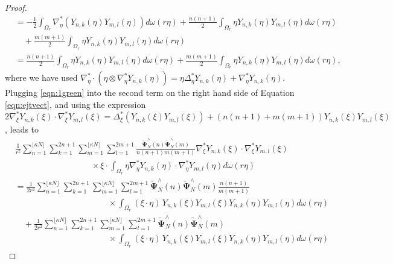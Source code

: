 \documentclass[a4paper, 10pt]{article}
\numberwithin{equation}{section}
\theoremstyle{definition}
\begin{document}
\begin{proof}
\begin{align}
&=-\frac{1}{2}\int_{\Omega_r}\nabla_{\eta }^*\left(Y_{n,k}\left(\eta \right)Y_{m,l}\left(\eta \right)\right)d\omega(r\eta)\nonumber
+\frac{n(n+1)}{2}\int_{\Omega_r}\eta  Y_{n,k}\left(\eta \right)Y_{m,l}\left(\eta \right)d\omega(r\eta)\nonumber
\\&\quad+\frac{m(m+1)}{2}\int_{\Omega_r}\eta  Y_{n,k}\left(\eta \right)Y_{m,l}\left(\eta \right)d\omega(r\eta)\nonumber
\\&=\frac{n(n+1)}{2}\int_{\Omega_r}\eta  Y_{n,k}\left(\eta \right)Y_{m,l}\left(\eta \right)d\omega(r\eta)\nonumber
+\frac{m(m+1)}{2}\int_{\Omega_r}\eta  Y_{n,k}\left(\eta \right)Y_{m,l}\left(\eta \right)d\omega(r\eta),\nonumber
\end{align}\normalsize
where we have used $\nabla_{\eta}^*\cdot\left(\eta\otimes\nabla^*_{\eta}Y_{n,k}\left(\eta\right)\right)=\eta\Delta_\eta^*Y_{n,k}\left(\eta\right)+\nabla_\eta^*Y_{n,k}\left(\eta\right)$. Plugging  \eqref{eqn:1green} into the second term on the right hand side of Equation \eqref{eqn:ejtvect}, and using the expression $2\nabla_\xi ^*Y_{n,k}(\xi )\cdot \nabla_\xi ^*Y_{m,l}(\xi )=\Delta_\xi ^*(Y_{n,k}(\xi )Y_{m,l}(\xi ))+(n(n+1)+m(m+1))Y_{n,k}(\xi )Y_{m,l}(\xi )$, leads to
\begin{align}
&\frac{1}{r^2}\sum_{n=1}^{\lfloor \kappa N\rfloor}\sum_{k=1}^{2n+1}\sum_{m=1}^{{\lfloor \kappa N\rfloor}}\sum_{l=1}^{2m+1}\frac{\tilde{\mathbf{\Psi}}_N^\wedge(n)\tilde{\mathbf{\Psi}}_N^\wedge(m)}{n(n+1)m(m+1)}\nabla^*_{\xi }Y_{n,k}\left(\xi \right)\cdot\nabla^*_{\xi }Y_{m,l}\left(\xi \right)\label{eqn:2term}
\\&\qquad\qquad\qquad\qquad\quad\times\xi \cdot\int_{\Omega_r}\eta \nabla^*_{\eta }Y_{n,k}\left(\eta \right)\cdot\nabla^*_{\eta }Y_{m,l}\left(\eta \right)d\omega(r\eta)\nonumber
\\&=\frac{1}{2r^2}\sum_{n=1}^{\lfloor \kappa N\rfloor}\sum_{k=1}^{2n+1}\sum_{m=1}^{{\lfloor \kappa N\rfloor}}\sum_{l=1}^{2m+1}\tilde{\mathbf{\Psi}}_N^\wedge(n)\tilde{\mathbf{\Psi}}_N^\wedge(m)\frac{n(n+1)}{m(m+1)}\nonumber
\\&\qquad\qquad\qquad\quad\qquad\qquad\times\int_{\Omega_r}(\xi\cdot\eta)\, Y_{n,k}\left(\xi \right)Y_{m,l}\left(\xi \right)Y_{n,k}\left(\eta \right)Y_{m,l}\left(\eta \right)d\omega(r\eta)\nonumber
\\&\quad+\frac{1}{2r^2}\sum_{n=1}^{\lfloor \kappa N\rfloor}\sum_{k=1}^{2n+1}\sum_{m=1}^{{\lfloor \kappa N\rfloor}}\sum_{l=1}^{2m+1}\tilde{\mathbf{\Psi}}_N^\wedge(n)\tilde{\mathbf{\Psi}}_N^\wedge(m)\nonumber
\\&\qquad\qquad\qquad\quad\qquad\qquad\times\int_{\Omega_r}(\xi\cdot\eta)\, Y_{n,k}\left(\xi \right)Y_{m,l}\left(\xi \right)Y_{n,k}\left(\eta \right)Y_{m,l}\left(\eta \right)d\omega(r\eta)\nonumber

\end{align}
\end{proof}
\end{document}
